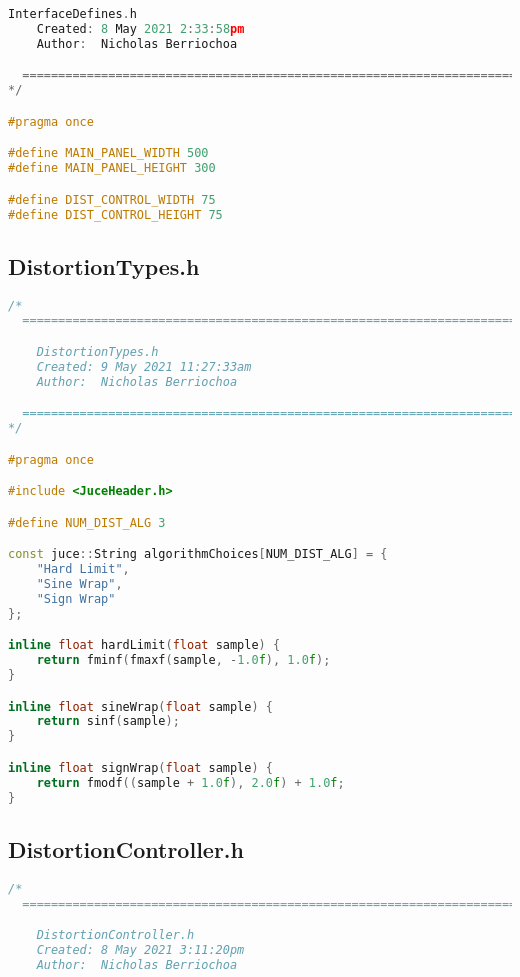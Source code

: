\documentclass{article}
\begin{document}
\begin{appendix}
\begin{lstlisting}[language=C++]
    InterfaceDefines.h
    Created: 8 May 2021 2:33:58pm
    Author:  Nicholas Berriochoa

  ==============================================================================
*/

#pragma once

#define MAIN_PANEL_WIDTH 500
#define MAIN_PANEL_HEIGHT 300

#define DIST_CONTROL_WIDTH 75
#define DIST_CONTROL_HEIGHT 75

\end{lstlisting}


\pagebreak
\subsection{DistortionTypes.h}
\begin{lstlisting}[language=C++]
/*
  ==============================================================================

    DistortionTypes.h
    Created: 9 May 2021 11:27:33am
    Author:  Nicholas Berriochoa

  ==============================================================================
*/

#pragma once

#include <JuceHeader.h>

#define NUM_DIST_ALG 3

const juce::String algorithmChoices[NUM_DIST_ALG] = {
    "Hard Limit",
    "Sine Wrap",
    "Sign Wrap"
};

inline float hardLimit(float sample) {
    return fminf(fmaxf(sample, -1.0f), 1.0f);
}

inline float sineWrap(float sample) {
    return sinf(sample);
}

inline float signWrap(float sample) {
    return fmodf((sample + 1.0f), 2.0f) + 1.0f;
}

\end{lstlisting}



\subsection{DistortionController.h}
\begin{lstlisting}[language=C++]
/*
  ==============================================================================

    DistortionController.h
    Created: 8 May 2021 3:11:20pm
    Author:  Nicholas Berriochoa


\end{lstlisting}
\end{appendix}
\end{document}
